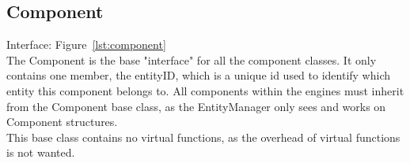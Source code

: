 \subsection{Component}
Interface: Figure~\ref{lst:component}\\\noindent
The Component is the base "interface" for all the component classes. 
It only contains one member, the entityID, which is a unique id used to identify which entity this component belongs to.
All components within the engines must inherit from the Component base class, as the EntityManager only sees and works on Component structures.\\
This base class contains no virtual functions, as the overhead of virtual functions is not wanted.
